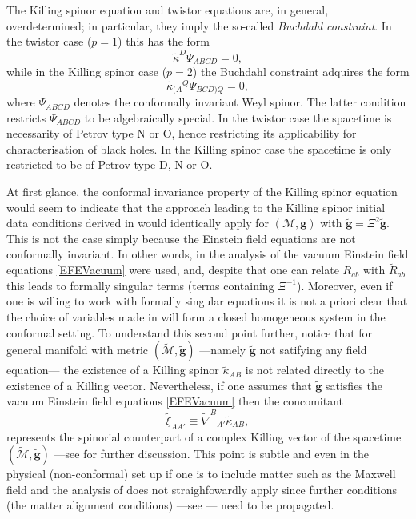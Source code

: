 \documentclass[10pt,a4paper]{article}
\theoremstyle{plain}
\def\bmg{{\bm g}}
\newcounter{mnotecount}%
\newcommand{\mnotex}[1]%
{\protect{\stepcounter{mnotecount}}$^{\mbox{\footnotesize $\bullet$\themnotecount}}$ 
\marginpar{%
\raggedright\tiny\em
$\!\!\!\!\!\!\,\bullet$\themnotecount: #1} }
\begin{document}
The Killing spinor equation and twistor equations are, in general,
overdetermined; in particular, they imply the so-called
\textit{Buchdahl constraint}.  In the twistor case ($p=1$) this has
the form
\[
\tilde{\kappa}^D\Psi_{ABCD}=0,
\]
while in the Killing spinor case ($p=2$) the Buchdahl constraint
adquires the form
\[
\tilde{\kappa}_{(A}{}^Q\Psi_{BCD)Q}=0,
\]
where $\Psi_{ABCD}$ denotes the conformally invariant Weyl spinor.
The latter condition restricts $\Psi_{ABCD}$ to be algebraically
special.  In the twistor case the spacetime is necessarity of Petrov
type N or O, hence restricting its applicability for characterisation of
black holes.  In the Killing spinor case the spacetime is only
restricted to be of Petrov type D, N or O.

\medskip

At first glance, the conformal invariance property of the
Killing spinor equation would seem to indicate that the
approach leading to the Killing spinor initial data conditions derived
in \cite{GarVal08c} would identically apply for $(\mathcal{M},\bmg)$
with $\tilde\bmg=\Xi^2\tilde{\bmg}$. This is not the case simply
because the Einstein field equations are not conformally invariant.
In other words, in the analysis of \cite{GarVal08c} the vacuum
Einstein field equations \eqref{EFEVacuum}
were used, and, despite
that one can relate $R_{ab}$ with $\tilde{R}_{ab}$ this leads to
formally singular terms (terms containing $\Xi^{-1}$). Moreover, even if one
is willing to work with formally singular equations it is not a priori clear
that the choice of variables made in \cite{GarVal08c} will form a
closed homogeneous system in the conformal setting.  To understand
this second point further, notice that for general manifold with
metric $(\tilde{\mathcal{M}},\tilde{\bmg})$ ---namely $\tilde{\bmg}$
not satifying any field equation--- the existence of a Killing spinor
$\tilde{\kappa}_{AB}$ is not related directly to the existence of a
Killing vector.
Nevertheless, if one assumes that $\tilde{\bmg}$
satisfies the vacuum Einstein field equations \eqref{EFEVacuum} then
the concomitant
\begin{equation*}
\tilde{\xi}_{AA'} \equiv \tilde{\nabla}^{B}{}_{A'}\tilde{\kappa}_{AB},
\end{equation*}
represents the spinorial counterpart of a complex Killing vector of
the spacetime $(\tilde{\mathcal{M}},\tilde{\bmg})$ ---see
\cite{GarVal08c} for further discussion. This point is subtle and even
in the physical (non-conformal) set up if one is to include matter
such as the Maxwell field and the analysis of \cite{GarVal08c} does
not straighfowardly apply since further conditions (the matter
alignment conditions) ---see \cite{ValCol16}--- need to be propagated.
\end{document}
